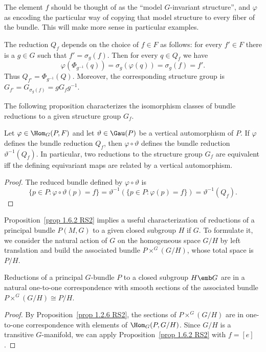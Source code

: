 The element $f$ should be thought of as the ``model $G$-invariant structure'', and $\varphi$ as encoding the particular way of copying that model structure to every fiber of the bundle. This will make more sense in particular examples.

\begin{rem}[{{\cite[Rem.~1.6.3]{RS2}}}]
    The reduction $Q_f$ depends on the choice of $f\in F$ as follows: for every $f'\in F$ there is a $g\in G$ such that $f'=\sigma_g(f)$. Then for every $q\in Q_f$ we have
    \[\varphi(\Phi_{g^{-1}}(q))=\sigma_g(\varphi(q))=\sigma_g(f)=f'.\]
    Thus $Q_{f'}=\Phi_{g^{-1}}(Q)$. Moreover, the corresponding structure group is $G_{f'}=G_{\sigma_g(f)}=gG_fg^{-1}$.
\end{rem}


The following proposition characterizes the isomorphism classes of bundle reductions to a given structure group $G_f$.

\begin{prop}[{{\cite[Prop.~1.6.4]{RS2}}}]\label{prop 1.6.4 RS2}
    Let $\varphi\in \Hom_G(P,F)$ and let $\vartheta\in\Gau(P)$ be a vertical automorphism of $P$. If $\varphi$ defines the bundle reduction $Q_f$, then $\varphi\circ\vartheta$ defines the bundle reduction $\vartheta^{-1}(Q_f)$. In particular, two reductions to the structure group $G_f$ are equivalent iff the defining equivariant maps are related by a vertical automorphism.
\end{prop}
\begin{proof}
    The reduced bundle defined by $\varphi\circ\vartheta$ is
    \[\{p\in P:\varphi\circ\vartheta(p)=f\}=\vartheta^{-1}\left(\{p\in P:\varphi(p)=f\}\right)=\vartheta^{-1}(Q_f).\]
\end{proof}

Proposition~\ref{prop 1.6.2 RS2} implies a useful characterization of reductions of a principal bundle $P(M,G)$ to a given closed subgroup $H$ if $G$. To formulate it, we consider the natural action of $G$ on the homogeneous space $G\slash H$ by left translation and build the associated bundle $P\times^G (G\slash H)$, whose total space is $P\slash H$.

\begin{cor}[{{\cite[Cor.~1.6.5]{RS2}}}]\label{cor 1.6.5 RS2}
    Reductions of a principal $G$-bundle $P$ to a closed subgroup $H\emb G$ are in a natural one-to-one correspondence with smooth sections of the associated bundle $P\times^G (G\slash H)\cong P\slash H$.
\end{cor}
\begin{proof}
    By Proposition~\ref{prop 1.2.6 RS2}, the sections of $P\times^G (G\slash H)$ are in one-to-one correspondence with elements of $\Hom_G(P,G\slash H)$. Since $G\slash H$ is a transitive $G$-manifold, we can apply Proposition~\ref{prop 1.6.2 RS2} with $f=[e]$.
\end{proof}

